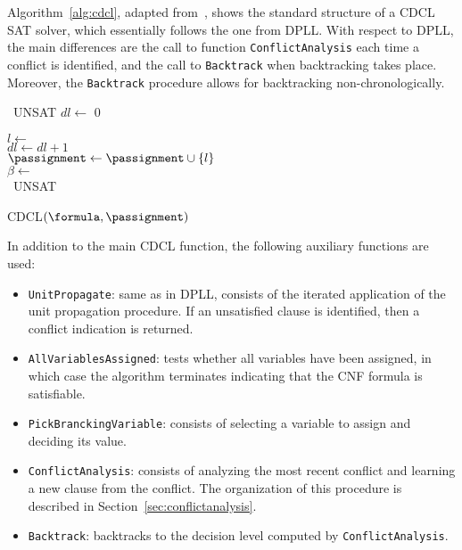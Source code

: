 Algorithm~\ref{alg:cdcl}, adapted from~\cite{cdclchapter}, shows the standard
structure of a CDCL SAT solver, which essentially follows the one from DPLL\@.
With respect to DPLL, the main differences are the call to function
\texttt{ConflictAnalysis} each time a conflict is identified, and the call to
\texttt{Backtrack} when backtracking takes place. Moreover, the
\texttt{Backtrack} procedure allows for backtracking non-chronologically. 

\begin{algorithm}[!ht]
    {\Return~UNSAT}
    $dl \leftarrow$ 0

    \While{$\neg$\alvarass{$\formula$, $\passignment$}}
    {%
        $l \leftarrow$ \pickvar{$\formula$, $\passignment$}\\
        $dl \leftarrow dl + 1$\\
        $\passignment \leftarrow \passignment \cup \{l\}$\\
        {%
            $\beta \leftarrow$ \\
            {\Return~UNSAT}
        }
    }
    \caption{CDCL$(\formula, \passignment)$}%
\label{alg:cdcl}
\end{algorithm}

In addition to the main CDCL function, the following auxiliary functions are
used:
\begin{itemize}
    \item \texttt{UnitPropagate}:
        same as in DPLL, consists of the iterated application of the unit
        propagation procedure. If an unsatisfied clause is identified, then a
        conflict indication is returned.
    \item \texttt{AllVariablesAssigned}:
        tests whether all variables have been assigned, in which case the
        algorithm terminates indicating that the CNF formula is satisfiable. 
    \item \texttt{PickBranckingVariable}:
        consists of selecting a variable to assign and deciding its value.
    \item \texttt{ConflictAnalysis}:
        consists of analyzing the most recent conflict and learning a new clause
        from the conflict. The organization of this procedure is described in
        Section~\ref{sec:conflictanalysis}.
    \item \texttt{Backtrack}:
        backtracks to the decision level computed by \texttt{ConflictAnalysis}.
\end{itemize}

